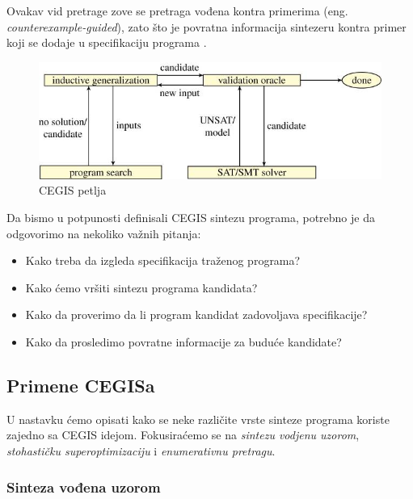 Ovakav vid pretrage zove se pretraga vođena kontra primerima (eng. \emph{counterexample-guided}), zato što je povratna informacija sintezeru kontra primer koji se dodaje u specifikaciju programa \cite{PSE}.

\begin{figure}[t]
    \begin{center}
        \includegraphics[scale=0.4]{resources/cegis.jpeg}
    \end{center}
    \caption{CEGIS petlja \cite{AboutPS}}
    \label{fig:cegis}
\end{figure}


Da bismo u potpunosti definisali CEGIS sintezu programa, potrebno je da odgovorimo na nekoliko važnih pitanja:

\begin{itemize}
    \item Kako treba da izgleda specifikacija traženog programa?
    \item Kako ćemo vršiti sintezu programa kandidata?
    \item Kako da proverimo da li program kandidat zadovoljava specifikacije?
    \item Kako da prosledimo povratne informacije za buduće kandidate?
\end{itemize}

\subsection{Primene CEGISa}
\label{subsec:PrimeneCEGISa}

U nastavku ćemo opisati kako se neke različite vrste sinteze programa koriste zajedno sa CEGIS idejom. Fokusiraćemo se na \emph{sintezu vodjenu uzorom}, \emph{stohastičku superoptimizaciju} i \emph{enumerativnu pretragu}.


\subsubsection{Sinteza vođena uzorom}
\label{subsec:OracleGuidedSynthesis}

